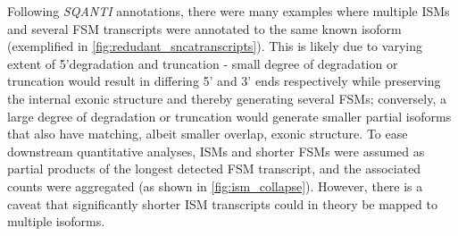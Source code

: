Following \textit{SQANTI} annotations, there were many examples where multiple ISMs and several FSM transcripts were annotated to the same known isoform (exemplified in \cref{fig:redudant_sncatranscripts}). This is likely due to varying extent of 5'degradation and truncation - small degree of degradation or truncation would result in differing 5' and 3' ends respectively while preserving the internal exonic structure and thereby generating several FSMs; conversely, a large degree of degradation or truncation would generate smaller partial isoforms that also have matching, albeit smaller overlap, exonic structure. To ease downstream quantitative analyses, ISMs and shorter FSMs were assumed as partial products of the longest detected FSM transcript, and the associated counts were aggregated (as shown in \cref{fig:ism_collapse}). However, there is a caveat that significantly shorter ISM transcripts could in theory be mapped to multiple isoforms.  

